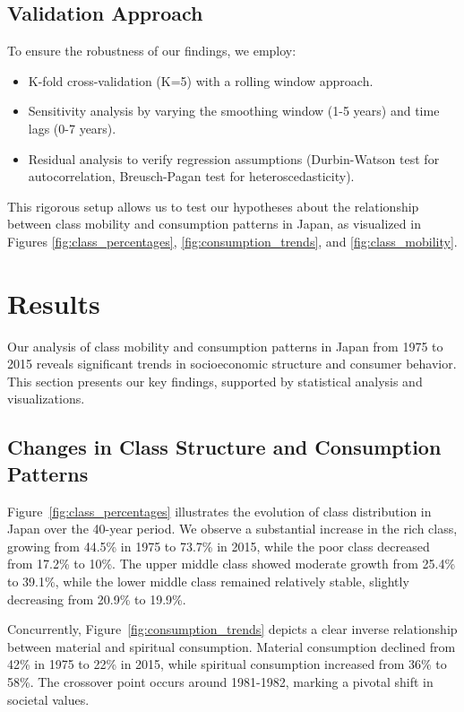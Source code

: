 \documentclass{article} %
\begin{document}
\subsection{Validation Approach}
To ensure the robustness of our findings, we employ:
\begin{itemize}
    \item K-fold cross-validation (K=5) with a rolling window approach.
    \item Sensitivity analysis by varying the smoothing window (1-5 years) and time lags (0-7 years).
    \item Residual analysis to verify regression assumptions (Durbin-Watson test for autocorrelation, Breusch-Pagan test for heteroscedasticity).
\end{itemize}

This rigorous setup allows us to test our hypotheses about the relationship between class mobility and consumption patterns in Japan, as visualized in Figures \ref{fig:class_percentages}, \ref{fig:consumption_trends}, and \ref{fig:class_mobility}.

\section{Results}
\label{sec:results}

Our analysis of class mobility and consumption patterns in Japan from 1975 to 2015 reveals significant trends in socioeconomic structure and consumer behavior. This section presents our key findings, supported by statistical analysis and visualizations.

\subsection{Changes in Class Structure and Consumption Patterns}
Figure~\ref{fig:class_percentages} illustrates the evolution of class distribution in Japan over the 40-year period. We observe a substantial increase in the rich class, growing from 44.5\% in 1975 to 73.7\% in 2015, while the poor class decreased from 17.2\% to 10\%. The upper middle class showed moderate growth from 25.4\% to 39.1\%, while the lower middle class remained relatively stable, slightly decreasing from 20.9\% to 19.9\%.

Concurrently, Figure~\ref{fig:consumption_trends} depicts a clear inverse relationship between material and spiritual consumption. Material consumption declined from 42\% in 1975 to 22\% in 2015, while spiritual consumption increased from 36\% to 58\%. The crossover point occurs around 1981-1982, marking a pivotal shift in societal values.
\end{document}
